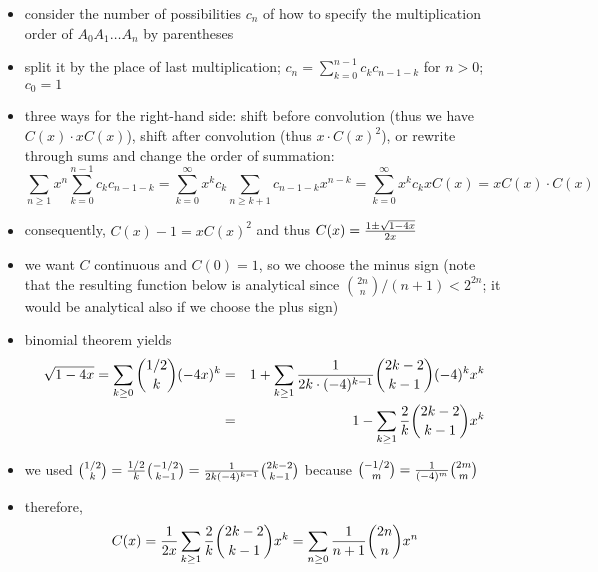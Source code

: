 \documentclass[10pt, a4paper]{article}
\newcommand*\ruleline[1]{\par\noindent\raisebox{.8ex}{\makebox[\linewidth]{\hrulefill\hspace{1ex}\raisebox{-.8ex}{#1}\hspace{1ex}\hrulefill}}}
\begin{document}
\ruleline{Catalan numbers [Knuth 357, example 4]}
\begin{itemize}
    \item consider the number of possibilities $c_n$ of how to specify the multiplication order of $A_0A_1\dots A_n$ by parentheses
    \item split it by the place of last multiplication; $c_n = \sum\limits_{k=0}^{n-1} c_kc_{n-1-k}$ for $n > 0$; $c_0=1$
    \item three ways for the right-hand side: shift before convolution (thus we have $C(x)\cdot xC(x)$),
            shift after convolution (thus $x\cdot C(x)^2$), or rewrite through sums and change the order of summation:
            $$\sum_{n\ge 1}x^n\sum_{k=0}^{n-1}c_kc_{n-1-k}=\sum_{k=0}^\infty x^kc_k\sum_{n\ge k+1} c_{n-1-k}x^{n-k}=\sum_{k=0}^\infty x^kc_k xC(x)=xC(x)\cdot C(x)$$
    \item consequently, $C(x) - 1 = xC(x)^2$ and thus $C(x) = {1\pm \sqrt{1-4x}\over 2x}$
    \item we want $C$ continuous and $C(0) = 1$, so we choose the minus sign (note that the resulting function below
            is analytical since ${2n\choose n}/(n+1) < 2^{2n}$; it would be analytical also if we choose the plus sign)
    \item binomial theorem yields
    \begin{eqnarray*}
        \sqrt{1-4x} = \sum_{k\ge 0} {1/2\choose k}(-4x)^k &=& 1+\sum_{k\ge 1}{1\over 2k\cdot (-4)^{k-1}}{2k-2\choose k-1}(-4)^kx^k\\
        &=& 1 - \sum_{k\ge 1}{2\over k}{2k-2\choose k-1}x^k 
    \end{eqnarray*}
    \item we used ${1/2\choose k}={1/2\over k}{-1/2\choose k-1} = {1\over 2k(-4)^{k-1}}{2k-2\choose k-1}$ because ${-1/2\choose m}={1\over (-4)^m}{2m\choose m}$
    \item therefore, $$C(x)={1\over 2x}\sum_{k\ge 1}{2\over k}{2k-2\choose k-1}x^k = \sum_{n\ge 0}{1\over n+1}{2n\choose n}x^n$$
\end{itemize}
\end{document}
